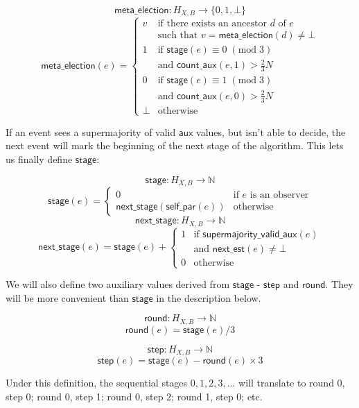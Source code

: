 \documentclass[a4paper,fleqn]{article}
\begin{document}
\[ \mathsf{meta\_election}: H_{X,B} \to \{0, 1, \bot\} \]
\[ \mathsf{meta\_election}(e) = \left\{ \begin{array}{ll}
	v & \textrm{if there exists an ancestor $d$ of $e$} \\
	& \textrm{such that $v = \mathsf{meta\_election}(d) \neq \bot$} \\
	1 & \textrm{if $\mathsf{stage}(e) \equiv 0\;(\textrm{mod}\;3)$} \\
	& \textrm{and $\mathsf{count\_aux}(e, 1) > \frac{2}{3}N$} \\
	0 & \textrm{if $\mathsf{stage}(e) \equiv 1\;(\textrm{mod}\;3)$} \\
	& \textrm{and $\mathsf{count\_aux}(e, 0) > \frac{2}{3}N$} \\
	\bot & \textrm{otherwise}
\end{array} \right. \]

If an event sees a supermajority of valid $\mathsf{aux}$ values, but isn't able to decide, the next
event will mark the beginning of the next stage of the algorithm. This lets us finally define
$\mathsf{stage}$:

\[ \mathsf{stage}: H_{X,B} \to \mathbb{N} \]
\[ \mathsf{stage}(e) = \left\{ \begin{array}{ll}
	0 & \textrm{if $e$ is an observer} \\
	\mathsf{next\_stage}(\mathsf{self\_par}(e)) & \textrm{otherwise}
\end{array}\right. \]
\[ \mathsf{next\_stage}: H_{X,B} \to \mathbb{N} \]
\[ \mathsf{next\_stage}(e) = \mathsf{stage}(e) + \left\{ \begin{array}{ll}
	1 & \textrm{if $\mathsf{supermajority\_valid\_aux}(e)$} \\
	& \textrm{and $\mathsf{next\_est}(e) \neq \bot$} \\
	0 & \textrm{otherwise}
\end{array}\right.\]

We will also define two auxiliary values derived from $\mathsf{stage}$ - $\mathsf{step}$ and
$\mathsf{round}$. They will be more convenient than $\mathsf{stage}$ in the description below.

\[ \mathsf{round}: H_{X,B} \to \mathbb{N} \]
\[ \mathsf{round}(e) = \mathsf{stage}(e) / 3 \]

\[ \mathsf{step}: H_{X,B} \to \mathbb{N} \]
\[ \mathsf{step}(e) = \mathsf{stage}(e) - \mathsf{round}(e) \times 3 \]

Under this definition, the sequential stages $0,1,2,3,...$ will translate to round 0, step 0; round
0, step 1; round 0, step 2; round 1, step 0; etc.
\end{document}
